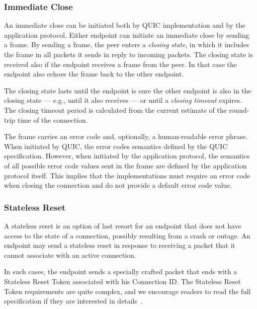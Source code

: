 \subsubsection{Immediate Close}

An immediate close can be initiated both by QUIC implementation and by the application protocol.
Either endpoint can initiate an immediate close by sending a \CONNECTIONCLOSE{} frame. By sending a
\CONNECTIONCLOSE{} frame, the peer enters a \textit{closing state}, in which it includes the
\CONNECTIONCLOSE{} frame in all packets it sends in reply to incoming packets. The closing state is
received also if the endpoint receives a \CONNECTIONCLOSE{} frame from the peer. In that case the
endpoint also echoes the \CONNECTIONCLOSE{} frame back to the other endpoint.

The closing state lasts until the endpoint is sure the other endpoint is also in the closing state ---
e.g., until it also receives \CONNECTIONCLOSE{} --- or until a \textit{closing timeout} expires. The
closing timeout period is calculated from the current estimate of the round-trip time of the
connection.

The \CONNECTIONCLOSE{} frame carries an error code and, optionally, a human-readable error phrase.
When initiated by QUIC, the error codes semantics defined by the QUIC specification. However, when
initiated by the application protocol, the semantics of all possible error code values sent in the
frame are defined by the application protocol itself. This implies that the implementations must
require an error code when closing the connection and do not provide a default error code value.

\subsubsection{Stateless Reset}\label{sec:02-stateless-reset}

A stateless reset is an option of last resort for an endpoint that does not have access to the state
of a connection, possibly resulting from a crash or outage. An endpoint may send a stateless reset
in response to receiving a packet that it cannot associate with an active connection.

In such cases, the endpoint sends a specially crafted packet that ends with a Stateless Reset Token
associated with his Connection ID\@. The Stateless Reset Token requirements are quite complex, and
we encourage readers to read the full specification if they are interested in details~\cite[Section~10.4]{draft-ietf-quic-transport}.


